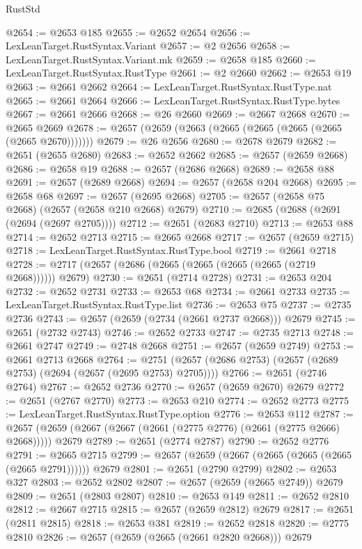 \begin{lexlean}{RustStd}
\begin{coremodule}
@2654 := @2653 @185
@2655 := @2652 @2654
@2656 := LexLeanTarget.RustSyntax.Variant
@2657 := @2 @2656
@2658 := LexLeanTarget.RustSyntax.Variant.mk
@2659 := @2658 @185
@2660 := LexLeanTarget.RustSyntax.RustType
@2661 := @2 @2660
@2662 := @2653 @19
@2663 := @2661 @2662
@2664 := LexLeanTarget.RustSyntax.RustType.nat
@2665 := @2661 @2664
@2666 := LexLeanTarget.RustSyntax.RustType.bytes
@2667 := @2661 @2666
@2668 := @26 @2660
@2669 := @2667 @2668
@2670 := @2665 @2669
@2678 := @2657 (@2659 (@2663 (@2665 (@2665 (@2665 (@2665 (@2665 @2670)))))))
@2679 := @26 @2656
@2680 := @2678 @2679
@2682 := @2651 (@2655 @2680)
@2683 := @2652 @2662
@2685 := @2657 (@2659 @2668)
@2686 := @2658 @19
@2688 := @2657 (@2686 @2668)
@2689 := @2658 @88
@2691 := @2657 (@2689 @2668)
@2694 := @2657 (@2658 @204 @2668)
@2695 := @2658 @68
@2697 := @2657 (@2695 @2668)
@2705 := @2657 (@2658 @75 @2668) (@2657 (@2658 @210 @2668) @2679)
@2710 := @2685 (@2688 (@2691 (@2694 (@2697 @2705))))
@2712 := @2651 (@2683 @2710)
@2713 := @2653 @88
@2714 := @2652 @2713
@2715 := @2665 @2668
@2717 := @2657 (@2659 @2715)
@2718 := LexLeanTarget.RustSyntax.RustType.bool
@2719 := @2661 @2718
@2728 := @2717 (@2657 (@2686 (@2665 (@2665 (@2665 (@2665 (@2719 @2668)))))) @2679)
@2730 := @2651 (@2714 @2728)
@2731 := @2653 @204
@2732 := @2652 @2731
@2733 := @2653 @68
@2734 := @2661 @2733
@2735 := LexLeanTarget.RustSyntax.RustType.list
@2736 := @2653 @75
@2737 := @2735 @2736
@2743 := @2657 (@2659 (@2734 (@2661 @2737 @2668))) @2679
@2745 := @2651 (@2732 @2743)
@2746 := @2652 @2733
@2747 := @2735 @2713
@2748 := @2661 @2747
@2749 := @2748 @2668
@2751 := @2657 (@2659 @2749)
@2753 := @2661 @2713 @2668
@2764 := @2751 (@2657 (@2686 @2753) (@2657 (@2689 @2753) (@2694 (@2657 (@2695 @2753) @2705))))
@2766 := @2651 (@2746 @2764)
@2767 := @2652 @2736
@2770 := @2657 (@2659 @2670) @2679
@2772 := @2651 (@2767 @2770)
@2773 := @2653 @210
@2774 := @2652 @2773
@2775 := LexLeanTarget.RustSyntax.RustType.option
@2776 := @2653 @112
@2787 := @2657 (@2659 (@2667 (@2667 (@2661 (@2775 @2776) (@2661 (@2775 @2666) @2668))))) @2679
@2789 := @2651 (@2774 @2787)
@2790 := @2652 @2776
@2791 := @2665 @2715
@2799 := @2657 (@2659 (@2667 (@2665 (@2665 (@2665 (@2665 @2791)))))) @2679
@2801 := @2651 (@2790 @2799)
@2802 := @2653 @327
@2803 := @2652 @2802
@2807 := @2657 (@2659 (@2665 @2749)) @2679
@2809 := @2651 (@2803 @2807)
@2810 := @2653 @149
@2811 := @2652 @2810
@2812 := @2667 @2715
@2815 := @2657 (@2659 @2812) @2679
@2817 := @2651 (@2811 @2815)
@2818 := @2653 @381
@2819 := @2652 @2818
@2820 := @2775 @2810
@2826 := @2657 (@2659 (@2665 (@2661 @2820 @2668))) @2679

\end{coremodule}
\end{lexlean}
